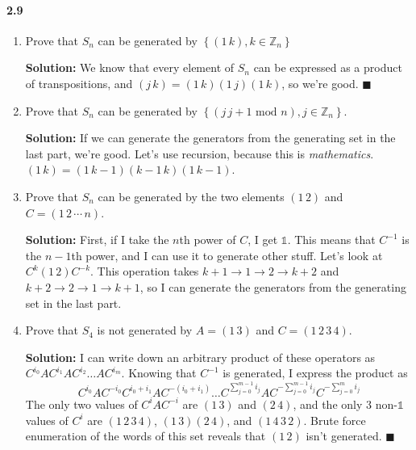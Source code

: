 \documentclass[12pt,a4paper]{article}
\providecommand{\id}{\mathbb{1}}
\providecommand{\soln}{\textbf{Solution: }}
\providecommand{\set}[1]{\left \lbrace #1 \right \rbrace}
\providecommand{\inv}{^{-1}}
\providecommand{\mod}{\textrm{ mod }}
\begin{document}
\paragraph*{2.9}
\begin{enumerate}[label=(\roman*)]
\item Prove that $S_n$ can be generated by $\set{(1 \, k), k \in \mathbb{Z}_n}$

\soln We know that every element of $S_n$ can be expressed as a product of transpositions, and $(j \, k) = (1 \, k) (1 \, j) (1 \, k)$, so we're good. $\blacksquare$
\item Prove that $S_n$ can be generated by $\set{(j \, j + 1 \mod n), j \in \mathbb{Z}_n}$. 

\soln If we can generate the generators from the generating set in the last part, we're good. 
Let's use recursion, because this is \emph{mathematics}. $(1 \, k) = (1 \, k-1) (k - 1 \, k) (1 \, k - 1)$.
\item Prove that $S_n$ can be generated by the two elements $(1 \, 2)$ and $C=( 1 \, 2 \, \cdots \, n)$.

\soln First, if I take the $n$th power of $C$, I get $\id$.
This means that $C\inv$ is the $n-1$th power, and I can use it to generate other stuff.
Let's look at $C^k(1 \, 2)C^{-k}$. 
This operation takes $k + 1 \rightarrow 1 \rightarrow 2 \rightarrow k + 2$ and $k + 2 \rightarrow 2 \rightarrow 1 \rightarrow k + 1$, so I can generate the generators from the generating set in the last part.
\item Prove that $S_4$ is not generated by $A=(1 \, 3)$ and $C=(1 \, 2 \, 3 \, 4)$.

\soln I can write down an arbitrary product of these operators as $C^{i_0}AC^{i_1}AC^{i_2}\ldots A C^{i_m}$.
Knowing that $C\inv$ is generated, I express the product as
\begin{equation*}
C^{i_0}AC^{-i_0} C^{i_0 + i_1}A C^{-(i_0 + i_1)} \ldots C^{\sum_{j=0}^{m-1} i_j } A C^{-\sum_{j=0}^{m-1} i_j } C^{-\sum_{j=0}^{m} i_j }
\end{equation*}
The only two values of $C^i A C^{-i}$ are $(1 \, 3)$ and $(2 \, 4)$, and the only 3 non-$\id$ values of $C^i$ are $(1 \, 2\, 3\, 4)$, $(1 \, 3) (2 \, 4)$, and $(1 \, 4\, 3\, 2)$. 
Brute force enumeration of the words of this set reveals that $(1 \, 2)$ isn't generated. $\blacksquare$
\end{enumerate}
\end{document}
